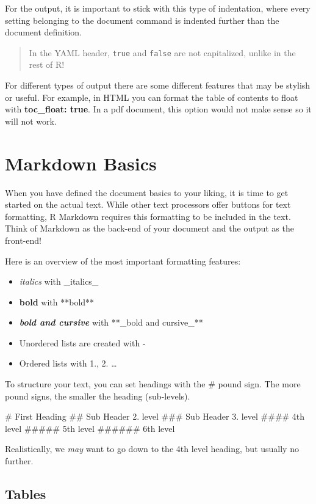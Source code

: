 \documentclass[
]{book}
\providecommand{\tightlist}{%
  \setlength{\itemsep}{0pt}\setlength{\parskip}{0pt}}
\begin{document}
For the output, it is important to stick with this type of indentation, where every setting belonging to the document command is indented further than the document definition.

\begin{quote}
In the YAML header, \texttt{true} and \texttt{false} are not capitalized, unlike in the rest of R!
\end{quote}

For different types of output there are some different features that may be stylish or useful.
For example, in HTML you can format the table of contents to float with \textbf{toc\_float: true}.
In a pdf document, this option would not make sense so it will not work.

\section{Markdown Basics}\label{markdown-basics}

When you have defined the document basics to your liking, it is time to get started on the actual text.
While other text processors offer buttons for text formatting, R Markdown requires this formatting to be included in the text.
Think of Markdown as the back-end of your document and the output as the front-end!

Here is an overview of the most important formatting features:

\begin{itemize}
\tightlist
\item
  \emph{italics} with \_italics\_
\item
  \textbf{bold} with **bold**
\item
  \textbf{\emph{bold and cursive}} with **\_bold and cursive\_**
\item
  Unordered lists are created with -
\item
  Ordered lists with 1., 2. \ldots{}
\end{itemize}

To structure your text, you can set headings with the \# pound sign.
The more pound signs, the smaller the heading (sub-levels).

\# First Heading
\#\# Sub Header 2. level
\#\#\# Sub Header 3. level
\#\#\#\# 4th level
\#\#\#\#\# 5th level
\#\#\#\#\#\# 6th level

Realistically, we \emph{may} want to go down to the 4th level heading, but usually no further.

\subsection*{Tables}\label{tables}
\end{document}
